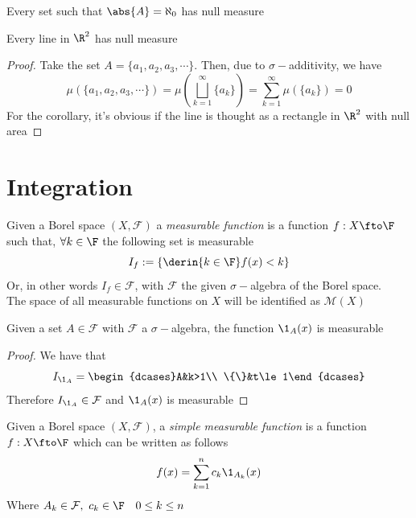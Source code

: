 \documentclass[../mmf.tex]{subfiles}
\begin{document}
\begin{thm}
	Every set such that $\abs{A}=\aleph_0$ has null measure
\end{thm}
\begin{cor}
	Every line in $\R^2$ has null measure
\end{cor}
\begin{proof}
	Take the set $A=\{a_1,a_2,a_3,\cdots\}$. Then, due to $\sigma-$additivity, we have
	\begin{equation}
		\mu\left( \{a_1,a_2,a_3,\cdots\} \right)=\mu\left( \bigsqcup_{k=1}^\infty\{a_k\} \right)=\sum_{k=1}^\infty\mu\left( \{a_k\} \right)=0
		\label{eq:sigmaddproof}
	\end{equation}
	For the corollary, it's obvious if the line is thought as a rectangle in $\R^2$ with null area
\end{proof}
\section{Integration}
\begin{dfn}
	Given a Borel space $(X,\mathcal{F})$ a \textit{measurable function} is a function $f:X\fto\F$ such that, $\forall k\in\F$ the following set is measurable
	\begin{equation}
		I_f:=\left\{\derin{k\in\F}f(x)<k \right\}
		\label{eq:fmesset}
	\end{equation}
	Or, in other words $I_f\in\mathcal{F}$, with $\mathcal{F}$ the given $\sigma-$algebra of the Borel space.\\
	The space of all measurable functions on $X$ will be identified as $\mathcal{M}(X)$
\end{dfn}
\begin{thm}
	Given a set $A\in\mathcal{F}$ with $\mathcal{F}$ a $\sigma-$algebra, the function $\1_A(x)$ is measurable
\end{thm}
\begin{proof}
	We have that
	\begin{equation*}
		I_{\1_A}=\begin{dcases}A&k>1\\ \{\}&t\le1\end{dcases}
	\end{equation*}
	Therefore $I_{\1_A}\in\mathcal{F}$ and $\1_A(x)$ is measurable
\end{proof}
\begin{dfn}
	Given a Borel space $(X,\mathcal{F})$, a \textit{simple measurable function} is a function $f:X\fto\F$ which can be written as follows
	\begin{equation}
		f(x)=\sum_{k=1}^nc_k\1_{A_k}(x)
		\label{eq:simplemef}
	\end{equation}
	Where $A_k\in\mathcal{F},\ c_k\in\F\quad 0\le k\le n$
\end{dfn}
\end{document}
